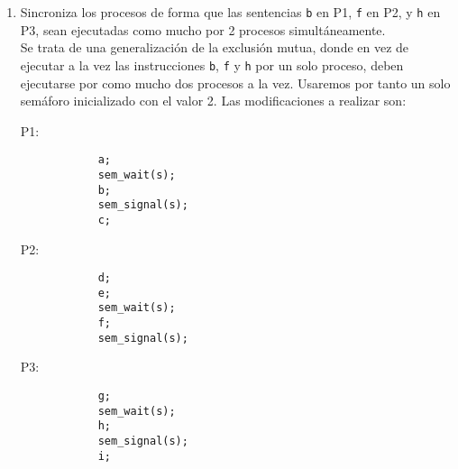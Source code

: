 \begin{ejercicio}
\begin{enumerate}
            Por tanto, las modificaciones a realizar son:
    \begin{multicols}{3}
        P1:
        \begin{verbatim}
            a;
            b;
            sem_signal(s1);
            sem_signal(s2);
            c;
        \end{verbatim}
        
        P2:
        \begin{verbatim}
            d;
            sem_wait(s1);
            e;
            f;
        \end{verbatim}

        P3:
        \begin{verbatim}
            g;
            sem_wait(s2);
            h;
            i;
        \end{verbatim}
    \end{multicols}
    También podríamos haber usado un sólo semáforo y que el proceso P1 realizara dos \verb|signal| después de la instrucción \verb|b|.
        \item Sincroniza los procesos de forma que las sentencias \verb|b| en P1, \verb|f| en P2, y \verb|h| en P3, sean ejecutadas como mucho por 2 procesos simultáneamente.\\
            Se trata de una generalización de la exclusión mutua, donde en vez de ejecutar a la vez las instrucciones \verb|b|, \verb|f| y \verb|h| por un solo proceso, deben ejecutarse por como mucho dos procesos a la vez. Usaremos por tanto un solo semáforo inicializado con el valor 2. Las modificaciones a realizar son:
    \begin{multicols}{3}
        P1:
        \begin{verbatim}
            a;
            sem_wait(s);
            b;
            sem_signal(s);
            c;
        \end{verbatim}
        
        P2:
        \begin{verbatim}
            d;
            e;
            sem_wait(s);
            f;
            sem_signal(s);
        \end{verbatim}

        P3:
        \begin{verbatim}
            g;
            sem_wait(s);
            h;
            sem_signal(s);
            i;
        \end{verbatim}
    \end{multicols}
    \end{enumerate}
\end{ejercicio}

